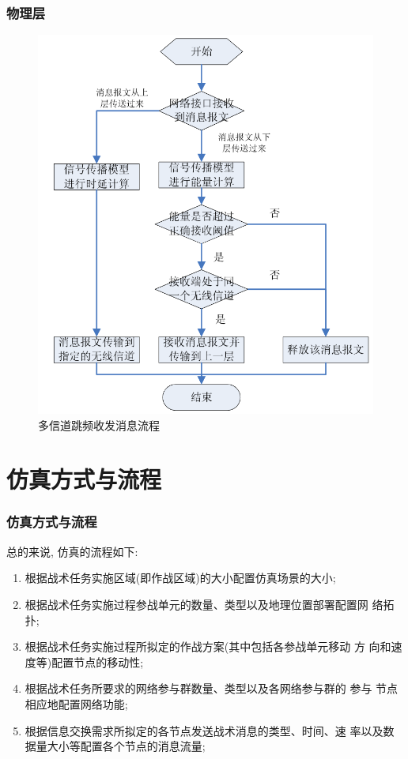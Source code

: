 \documentclass[10pt,mathserif]{beamer}%
\begin{document}
\begin{frame}[fragile]
	\frametitle{物理层}
	\setlength{\parindent}{2em}
	\begin{spacing}{1.5}
		\begin{figure}[htb]
			\centering
			\includegraphics[width=0.6\linewidth]{./images/phy.png}
			\caption{多信道跳频收发消息流程}
			\label{Fig:phy}
		\end{figure}
	\end{spacing}
\end{frame}

\section{仿真方式与流程}

\begin{frame}[fragile]
	\frametitle{仿真方式与流程}
	\begin{spacing}{1.5}
		总的来说, 仿真的流程如下:
		\begin{enumerate}
			\item 根据战术任务实施区域(即作战区域)的大小配置仿真场景的大小;
			\item 根据战术任务实施过程参战单元的数量、类型以及地理位置部署配置网
				络拓扑;
			\item 根据战术任务实施过程所拟定的作战方案(其中包括各参战单元移动
				方 向和速度等)配置节点的移动性;  
			\item 根据战术任务所要求的网络参与群数量、类型以及各网络参与群的
				参与 节点相应地配置网络功能;  
			\item 根据信息交换需求所拟定的各节点发送战术消息的类型、时间、速
				率以及数据量大小等配置各个节点的消息流量;  
		\end{enumerate}
	\end{spacing}
\end{frame}
\end{document}
